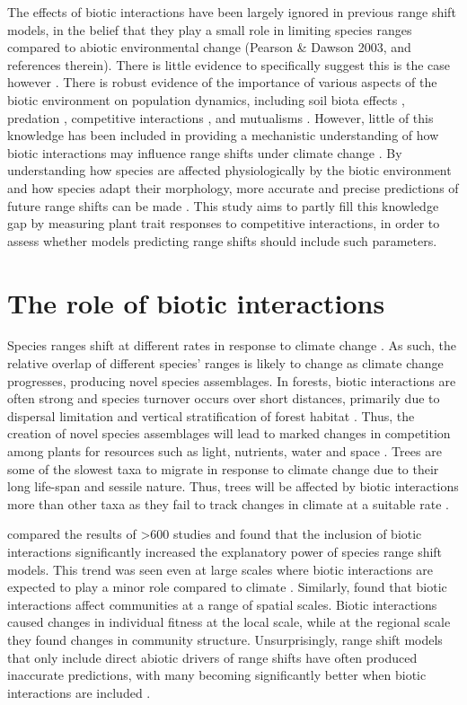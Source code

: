 \documentclass[a4paper,10pt,]{report}
\begin{document}
The effects of biotic interactions have been largely ignored in previous range shift models, in the belief that they play a small role in limiting species ranges compared to abiotic environmental change (Pearson \& Dawson 2003, and references therein). There is little evidence to specifically suggest this is the case however \citep{Araujo2007}. There is robust evidence of the importance of various aspects of the biotic environment on population dynamics, including soil biota effects \citep{Wardle2004, VanGrunsven2010}, predation \citep{Hillyer2010}, competitive interactions \citep{Freckleton2009}, and mutualisms \citep{Meier2010}. However, little of this knowledge has been included in providing a mechanistic understanding of how biotic interactions may influence range shifts under climate change \citep{Araujo2007}. By understanding how species are affected physiologically by the biotic environment and how species adapt their morphology, more accurate and precise predictions of future range shifts can be made \citep{Feeley2010, Feeley2012}. %
%
This study aims to partly fill this knowledge gap by measuring plant trait responses to competitive interactions, in order to assess whether models predicting range shifts should include such parameters.

\section{The role of biotic interactions}
Species ranges shift at different rates in response to climate change \citep{Walther2002}. As such, the relative overlap of different species' ranges is likely to change as climate change progresses, producing novel species assemblages. In forests, biotic interactions are often strong and species turnover occurs over short distances, primarily due to dispersal limitation and vertical stratification of forest habitat \citep{Condit2002}. Thus, the creation of novel species assemblages will lead to marked changes in competition among plants for resources such as light, nutrients, water and space \citep{Schweiger2008}. Trees are some of the slowest taxa to migrate in response to climate change due to their long life-span and sessile nature. Thus, trees will be affected by biotic interactions more than other taxa as they fail to track changes in climate at a suitable rate \citep{Wisz2013}. 

\citet{Araujo2007} compared the results of >600 studies and found that the inclusion of biotic interactions significantly increased the explanatory power of species range shift models. This trend was seen even at large scales where biotic interactions are expected to play a minor role compared to climate \citep{Davis1998}. Similarly, \citet{Gilman2010} found that biotic interactions affect communities at a range of spatial scales. Biotic interactions caused changes in individual fitness at the local scale, while at the regional scale they found changes in community structure. Unsurprisingly, range shift models that only include direct abiotic drivers of range shifts have often produced inaccurate predictions, with many becoming significantly better when biotic interactions are included \citep{Heikkinen2007}.
\end{document}
